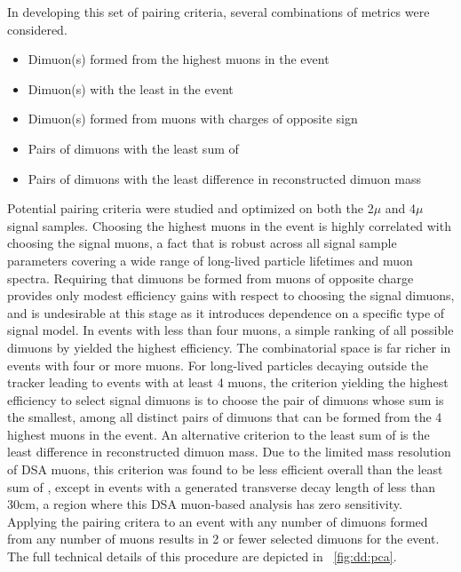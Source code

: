 In developing this set of pairing criteria, several combinations of metrics were considered.
\begin{itemize}
  \item Dimuon(s) formed from the highest \pT muons in the event
  \item Dimuon(s) with the least \vchisq in the event
  \item Dimuon(s) formed from muons with charges of opposite sign
  \item Pairs of dimuons with the least sum of \vchisq
  \item Pairs of dimuons with the least difference in reconstructed dimuon mass
\end{itemize}

Potential pairing criteria were studied and optimized on both the 2$\mu$ and 4$\mu$ signal samples.
Choosing the highest \pT muons in the event is highly correlated with choosing the signal muons, a fact that is robust across all signal sample parameters covering a wide range of long-lived particle lifetimes and muon \pT spectra.
Requiring that dimuons be formed from muons of opposite charge provides only modest efficiency gains with respect to choosing the signal dimuons, and is undesirable at this stage as it introduces dependence on a specific type of signal model.
In events with less than four muons, a simple ranking of all possible dimuons by \vchisq yielded the highest efficiency.
The combinatorial space is far richer in events with four or more muons.
For long-lived particles decaying outside the tracker leading to events with at least 4 muons, the criterion yielding the highest efficiency to select signal dimuons is to choose the pair of dimuons whose \vchisq sum is the smallest, among all distinct pairs of dimuons that can be formed from the 4 highest \pT muons in the event. 
An alternative criterion to the least sum of \vchisq is the least difference in reconstructed dimuon mass.
Due to the limited mass resolution of DSA muons, this criterion was found to be less efficient overall than the least sum of \vchisq, except in events with a generated transverse decay length of less than 30\unit{cm}, a region where this DSA muon-based analysis has zero sensitivity.
Applying the pairing critera to an event with any number of dimuons formed from any number of muons results in 2 or fewer selected dimuons for the event.
The full technical details of this procedure are depicted in \Fig~\ref{fig:dd:pca}.

